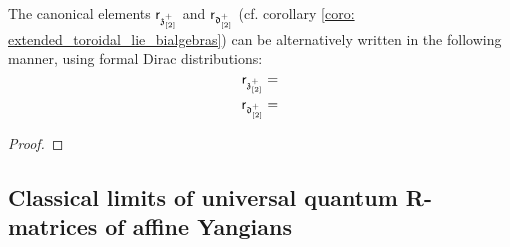         \begin{corollary}
            The canonical elements $\mathsf{r}_{\mathfrak{z}_{[2]}^+}$ and $\mathsf{r}_{\mathfrak{d}_{[2]}^+}$ (cf. corollary \ref{coro: extended_toroidal_lie_bialgebras}) can be alternatively written in the following manner, using formal Dirac distributions:
                $$\mathsf{r}_{\mathfrak{z}_{[2]}^+} = $$
                $$\mathsf{r}_{\mathfrak{d}_{[2]}^+} = $$
        \end{corollary}
            \begin{proof}
                
            \end{proof}

    \subsection{Classical limits of universal quantum R-matrices of affine Yangians}